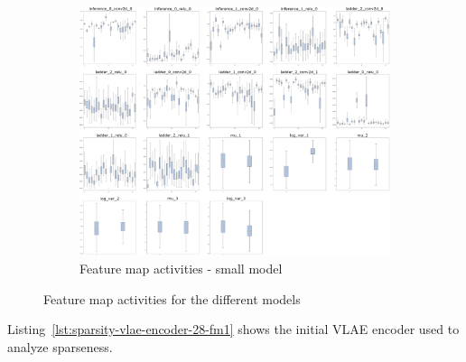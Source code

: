 \begin{figure}
    \ContinuedFloat
    \centering
    \begin{subfigure}{.95\textwidth}
        \centering
        \includegraphics[width=\textwidth]{images/sparseness/encoder_fm3_fms.png}
        \caption{Feature map activities - small model}
    \end{subfigure}
    \caption{Feature map activities for the different models}
    \label{fig:fm_activities_sparseness}
\end{figure}

Listing~\ref{lst:sparsity-vlae-encoder-28-fm1} shows the initial \ac{VLAE} encoder used to analyze sparseness.

